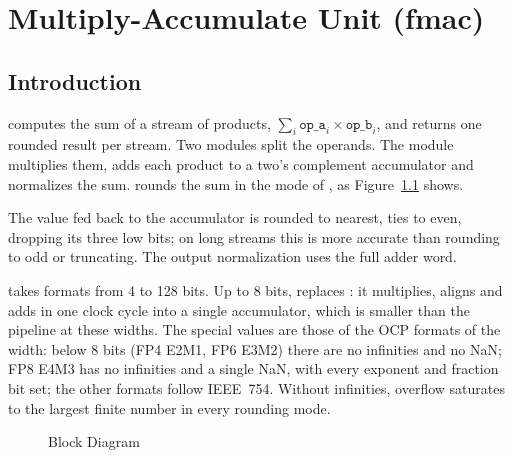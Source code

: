 \chapter{Multiply-Accumulate Unit (fmac)}
\label{ch:fmac}

\section{Introduction}

 computes the sum of a stream of products,
$\sum_i \mathtt{op\_a}_i\times\mathtt{op\_b}_i$, and returns one rounded result
per stream. Two  modules split the operands. The  module
multiplies them, adds each product to a two's complement accumulator and
normalizes the sum.  rounds the sum in the mode of , as
Figure~\ref{fig:fmac} shows.

The value fed back to the accumulator is rounded to nearest, ties to even, dropping
its three low bits; on long streams this is more accurate than rounding to odd or
truncating. The output normalization uses the full adder word.

 takes formats from 4 to 128 bits. Up to 8 bits,  replaces
: it multiplies, aligns and adds in one clock cycle into a single
accumulator, which is smaller than the pipeline at these widths. The special values
are those of the OCP formats of the width: below 8 bits (FP4 E2M1, FP6 E3M2) there
are no infinities and no NaN; FP8 E4M3 has no infinities and a single NaN, with every
exponent and fraction bit set; the other formats follow IEEE~754. Without infinities,
overflow saturates to the largest finite number in every rounding mode.

\begin{figure}[H]
\centering
{}
\caption{ Block Diagram}
\label{fig:fmac}
\end{figure}

